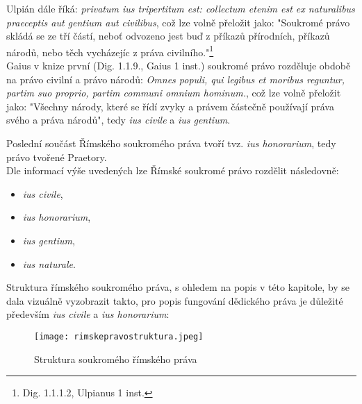 \documentclass{article}
\begin{document}
Ulpián dále říká: \textit{privatum ius tripertitum est: collectum etenim est ex naturalibus praeceptis aut gentium aut civilibus}, což lze volně přeložit jako: "Soukromé právo skládá se ze tří částí, neboť odvozeno jest buď z příkazů přírodních, příkazů národů, nebo těch vycházejíc z práva civilního."\footnote{Dig. 1.1.1.2, Ulpianus 1 inst.} \\

Gaius v knize první (Dig. 1.1.9., Gaius 1 inst.) soukromé právo rozděluje obdobě na právo civilní a právo národů: \textit{Omnes populi, qui legibus et moribus reguntur, partim suo proprio, partim communi omnium hominum.}, což lze volně přeložit jako: "Všechny národy, které se řídí zvyky a právem částečně používají práva svého a práva národů", tedy \textit{ius civile} a \textit{ius gentium}. \\

\newpage

Poslední součást Římského soukromého práva tvoří tvz. \textit{ius honorarium}, tedy právo tvořené Praetory. \\

Dle informací výše uvedených lze Římské soukromé právo rozdělit následovně:

\vspace{5 mm}

\begin{itemize}
\item \textit{ius civile},
\item \textit{ius honorarium},
\item \textit{ius gentium},
\item \textit{ius naturale}.
\end{itemize}

\vspace{5 mm}

Struktura římského soukromého práva, s ohledem na popis v této kapitole, by se dala vizuálně vyzobrazit takto, pro popis fungování dědického práva je důležité především \textit{ius civile} a \textit{ius honorarium}:

\begin{figure}[h]
\centering
\texttt{[image: rimskepravostruktura.jpeg]}
\caption{Struktura soukromého římského práva}
\label{fig:struktura}
\end{figure}

\newpage
\end{document}
